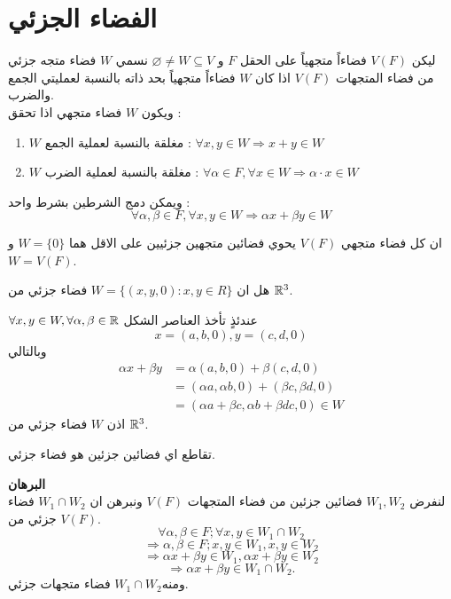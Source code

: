 \section{الفضاء الجزئي}
ليكن $V(F)$ فضاءاً متجهياً على الحقل $F$ و $\varnothing \neq W\subseteq V$ نسمي $W$ فضاء متجه جزئي من فضاء المتجهات $V(F)$ اذا كان $W$ فضاءاً متجهياً بحد ذاته بالنسبة لعمليتي الجمع والضرب.\\
\noindent
ويكون $W$ فضاء متجهي اذا تحقق :
\begin{enumerate}
	\item $W$ مغلقة بالنسبة لعملية الجمع : $\forall x, y \in W \Rightarrow x+y \in W$
	\item $W$ مغلقة بالنسبة لعملية الضرب : $\forall \alpha \in F,\forall x \in W \Rightarrow \alpha\cdot x\in W$
\end{enumerate}
ويمكن دمج الشرطين بشرط واحد :
\[
\forall \alpha, \beta \in F , \forall x, y \in W \Rightarrow \alpha x + \beta y \in W
\]
\begin{note}
	ان كل فضاء متجهي $V(F)$ يحوي فضائين متجهين جزئيين على الاقل هما $W = \{0\}$ و $W = V(F)$.
\end{note}

\begin{example}
	هل ان 
	$W = \{(x, y, 0) : x, y\in R\}$
	فضاء جزئي من $\mathbb{R}^3$.
\end{example}
\begin{solution}
	$\forall x, y \in W, \forall \alpha, \beta\in \mathbb{R}$ عندئذٍ تأخذ العناصر الشكل
	\[
	x = (a, b, 0), y = (c,d,0)
	\]
	وبالتالي
	\begin{align*}
		\alpha x + \beta y &= \alpha(a, b,0) + \beta (c,d,0)\\
		&= (\alpha a, \alpha b, 0) + (\beta c , \beta d, 0)\\
		&= (\alpha a + \beta c, \alpha b + \beta dc, 0) \in W
	\end{align*}
	اذن $W$ فضاء جزئي من $\mathbb{R}^3$.
\end{solution}

\begin{theorem}
	تقاطع اي فضائين جزئين هو فضاء جزئي.
\end{theorem}
\noindent
\textbf{البرهان}\\
\noindent
لنفرض $W_1, W_2 $ فضائين جزئين من فضاء المتجهات $V(F)$ ونبرهن ان $W_1\cap W_2$ فضاء جزئي من $V(F)$.
\[
\forall \alpha, \beta\in F; \forall x,y\in W_1\cap W_2
\]
\[
\Rightarrow\alpha,\beta\in F; x, y \in W_1, x, y\in W_2
\]
\[
\Rightarrow\alpha x + \beta y \in W_1, \alpha x + \beta y \in W_2
\]
\[
\Rightarrow\alpha x + \beta y \in W_1\cap W_2. 
\]
ومنه$W_1\cap W_2$ فضاء متجهات جزئي.

